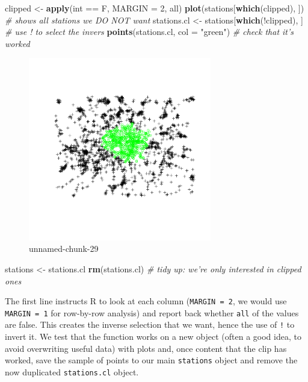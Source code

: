 \documentclass[]{article}
\newenvironment{Shaded}{}{}
\newcommand{\KeywordTok}[1]{\textcolor[rgb]{0.00,0.44,0.13}{\textbf{{#1}}}}
\newcommand{\DataTypeTok}[1]{\textcolor[rgb]{0.56,0.13,0.00}{{#1}}}
\newcommand{\DecValTok}[1]{\textcolor[rgb]{0.25,0.63,0.44}{{#1}}}
\newcommand{\StringTok}[1]{\textcolor[rgb]{0.25,0.44,0.63}{{#1}}}
\newcommand{\CommentTok}[1]{\textcolor[rgb]{0.38,0.63,0.69}{\textit{{#1}}}}
\newcommand{\NormalTok}[1]{{#1}}
\begin{document}
\begin{Shaded}
\begin{Highlighting}[]
\NormalTok{clipped <- }\KeywordTok{apply}\NormalTok{(int == F, }\DataTypeTok{MARGIN =} \DecValTok{2}\NormalTok{, all)}
\KeywordTok{plot}\NormalTok{(stations[}\KeywordTok{which}\NormalTok{(clipped), ])  }\CommentTok{# shows all stations we DO NOT want}
\NormalTok{stations.cl <- stations[}\KeywordTok{which}\NormalTok{(!clipped), ]  }\CommentTok{# use ! to select the invers}
\KeywordTok{points}\NormalTok{(stations.cl, }\DataTypeTok{col =} \StringTok{"green"}\NormalTok{)  }\CommentTok{# check that it's worked}
\end{Highlighting}
\end{Shaded}
\begin{figure}[htbp]
\centering
\includegraphics[width=8cm]{figure/unnamed-chunk-29.png}
\caption{unnamed-chunk-29}
\end{figure}

\begin{Shaded}
\begin{Highlighting}[]
\NormalTok{stations <- stations.cl}
\KeywordTok{rm}\NormalTok{(stations.cl)  }\CommentTok{# tidy up: we're only interested in clipped ones}
\end{Highlighting}
\end{Shaded}
The first line instructs R to look at each column (\texttt{MARGIN = 2},
we would use \texttt{MARGIN = 1} for row-by-row analysis) and report
back whether \texttt{all} of the values are false. This creates the
inverse selection that we want, hence the use of \texttt{!} to invert
it. We test that the function works on a new object (often a good idea,
to avoid overwriting useful data) with plots and, once content that the
clip has worked, save the sample of points to our main \texttt{stations}
object and remove the now duplicated \texttt{stations.cl} object.
\end{document}
